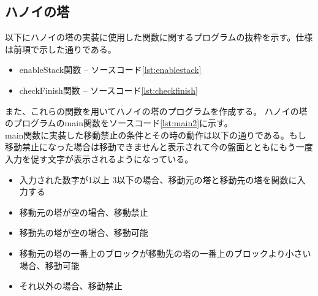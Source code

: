 \documentclass[dvipdfmx]{jsarticle}
\begin{document}
\subsection{ハノイの塔}
以下にハノイの塔の実装に使用した関数に関するプログラムの抜粋を示す。仕様は前項で示した通りである。
\begin{itemize}
  \item enableStack関数 --  ソースコード\ref{lst:enablestack}
  \item checkFinish関数 --  ソースコード\ref{lst:checkfinish}
\end{itemize}
また、これらの関数を用いてハノイの塔のプログラムを作成する。
ハノイの塔のプログラムのmain関数をソースコード\ref{lst:main2}に示す。\\
main関数に実装した移動禁止の条件とその時の動作は以下の通りである。もし移動禁止になった場合は移動できませんと表示されて今の盤面とともにもう一度入力を促す文字が表示されるようになっている。
\begin{itemize}
  \item 入力された数字が1以上 3以下の場合、移動元の塔と移動先の塔を関数に入力する
  \item 移動元の塔が空の場合、移動禁止
  \item 移動先の塔が空の場合、移動可能
  \item 移動元の塔の一番上のブロックが移動先の塔の一番上のブロックより小さい場合、移動可能
  \item それ以外の場合、移動禁止
\end{itemize}
\end{document}
